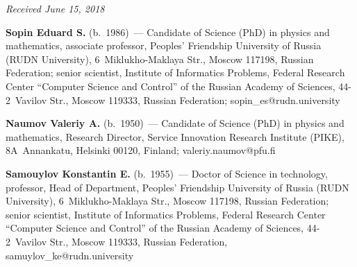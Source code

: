 \vspace*{-6pt}

\hfill{\small\textit{Received June 15, 2018}}



\Contr

\noindent
\textbf{Sopin Eduard S.} (b.\ 1986)~--- Candidate of Science (PhD) in physics 
and mathematics, associate professor, Peoples' Friendship University of Russia 
(RUDN University), 6~Miklukho-Maklaya Str., Moscow 117198, Russian 
Federation; senior scientist, Institute of Informatics Problems, Federal Research 
Center ``Computer Science and Control'' of the Russian Academy of Sciences,  
44-2~Vavilov Str., Moscow 119333, Russian Federation; 
\mbox{sopin\_es@rudn.university}

\vspace*{3pt}

\noindent
\textbf{Naumov Valeriy A.} (b.\ 1950)~--- Candidate of Science (PhD) in physics 
and mathematics, Research Director, Service Innovation Research Institute (PIKE), 
8A~Annankatu, Helsinki 00120, Finland; \mbox{valeriy.naumov@pfu.fi}

\vspace*{3pt}

\noindent
\textbf{Samouylov Konstantin E.} (b.\ 1955)~--- Doctor of Science in 
technology, professor, Head of Department, Peoples' Friendship University of 
Russia (RUDN University), 6~Miklukho-Maklaya Str., Moscow 117198, Russian 
Federation; senior scientist, Institute of Informatics Problems, Federal Research 
Center ``Computer Science and Control'' of the Russian Academy of Sciences,  
44-2~Vavilov Str., Moscow 119333, Russian Federation, 
\mbox{samuylov\_ke@rudn.university}
  
\label{end\stat}


\renewcommand{\bibname}{\protect\rm Литература} 